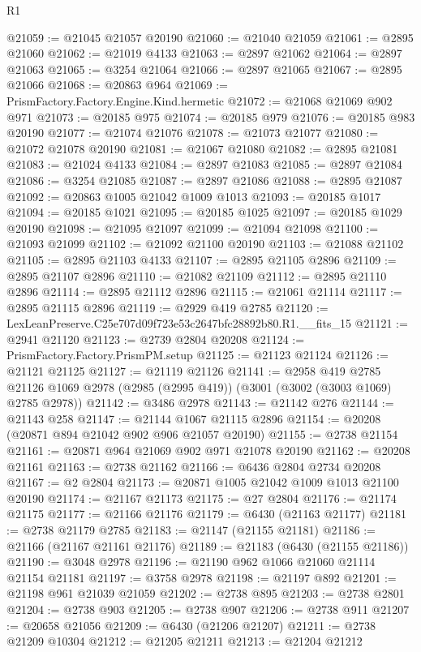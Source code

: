 \begin{lexlean}{R1}
\begin{coremodule}
@21059 := @21045 @21057 @20190
@21060 := @21040 @21059
@21061 := @2895 @21060
@21062 := @21019 @4133
@21063 := @2897 @21062
@21064 := @2897 @21063
@21065 := @3254 @21064
@21066 := @2897 @21065
@21067 := @2895 @21066
@21068 := @20863 @964
@21069 := PrismFactory.Factory.Engine.Kind.hermetic
@21072 := @21068 @21069 @902 @971
@21073 := @20185 @975
@21074 := @20185 @979
@21076 := @20185 @983 @20190
@21077 := @21074 @21076
@21078 := @21073 @21077
@21080 := @21072 @21078 @20190
@21081 := @21067 @21080
@21082 := @2895 @21081
@21083 := @21024 @4133
@21084 := @2897 @21083
@21085 := @2897 @21084
@21086 := @3254 @21085
@21087 := @2897 @21086
@21088 := @2895 @21087
@21092 := @20863 @1005 @21042 @1009 @1013
@21093 := @20185 @1017
@21094 := @20185 @1021
@21095 := @20185 @1025
@21097 := @20185 @1029 @20190
@21098 := @21095 @21097
@21099 := @21094 @21098
@21100 := @21093 @21099
@21102 := @21092 @21100 @20190
@21103 := @21088 @21102
@21105 := @2895 @21103 @4133
@21107 := @2895 @21105 @2896
@21109 := @2895 @21107 @2896
@21110 := @21082 @21109
@21112 := @2895 @21110 @2896
@21114 := @2895 @21112 @2896
@21115 := @21061 @21114
@21117 := @2895 @21115 @2896
@21119 := @2929 @419 @2785
@21120 := LexLeanPreserve.C25e707d09f723e53c2647bfc28892b80.R1.__fits_15
@21121 := @2941 @21120
@21123 := @2739 @2804 @20208
@21124 := PrismFactory.Factory.PrismPM.setup
@21125 := @21123 @21124
@21126 := @21121 @21125
@21127 := @21119 @21126
@21141 := @2958
    @419
    @2785
    @21126
    @1069
    @2978
    (@2985 (@2995 @419))
    (@3001 (@3002 (@3003 @1069) @2785 @2978))
@21142 := @3486 @2978
@21143 := @21142 @276
@21144 := @21143 @258
@21147 := @21144 @1067 @21115 @2896
@21154 := @20208 (@20871 @894 @21042 @902 @906 @21057 @20190)
@21155 := @2738 @21154
@21161 := @20871 @964 @21069 @902 @971 @21078 @20190
@21162 := @20208 @21161
@21163 := @2738 @21162
@21166 := @6436 @2804 @2734 @20208
@21167 := @2 @2804
@21173 := @20871 @1005 @21042 @1009 @1013 @21100 @20190
@21174 := @21167 @21173
@21175 := @27 @2804
@21176 := @21174 @21175
@21177 := @21166 @21176
@21179 := @6430 (@21163 @21177)
@21181 := @2738 @21179 @2785
@21183 := @21147 (@21155 @21181)
@21186 := @21166 (@21167 @21161 @21176)
@21189 := @21183 (@6430 (@21155 @21186))
@21190 := @3048 @2978
@21196 := @21190 @962 @1066 @21060 @21114 @21154 @21181
@21197 := @3758 @2978
@21198 := @21197 @892
@21201 := @21198 @961 @21039 @21059
@21202 := @2738 @895
@21203 := @2738 @2801
@21204 := @2738 @903
@21205 := @2738 @907
@21206 := @2738 @911
@21207 := @20658 @21056
@21209 := @6430 (@21206 @21207)
@21211 := @2738 @21209 @10304
@21212 := @21205 @21211
@21213 := @21204 @21212

\end{coremodule}
\end{lexlean}
